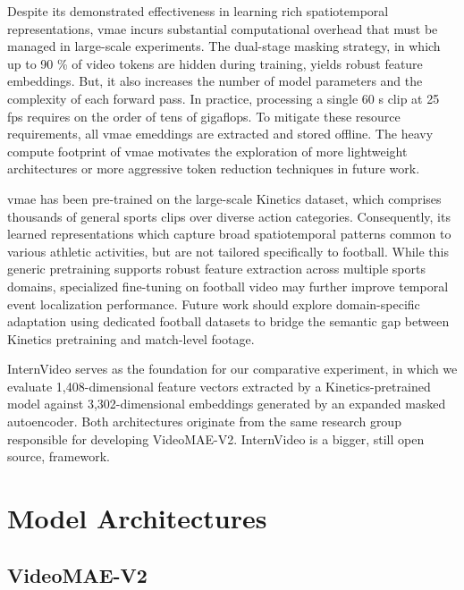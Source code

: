 Despite its demonstrated effectiveness in learning rich spatiotemporal representations, \acrlong{vmae} incurs substantial computational overhead that must be managed in large-scale experiments. The dual-stage masking strategy, in which up to 90 \% of video tokens are hidden during training, yields robust feature embeddings. But, it also increases the number of model parameters and the complexity of each forward pass. In practice, processing a single 60 s clip at 25 fps requires on the order of tens of gigaflops\cite{wang_videomae_2023}. To mitigate these resource requirements, all \acrlong{vmae} emeddings are extracted and stored offline. The heavy compute footprint of \acrlong{vmae} motivates the exploration of more lightweight architectures or more aggressive token reduction techniques in future work. 

\acrlong{vmae} has been pre-trained on the large-scale Kinetics dataset, which comprises thousands of general sports clips over diverse action categories. Consequently, its learned representations which capture broad spatiotemporal patterns common to various athletic activities, but are not tailored specifically to football. While this generic pretraining supports robust feature extraction across multiple sports domains, specialized fine-tuning on football video may further improve temporal event localization performance. Future work should explore domain-specific adaptation using dedicated football datasets to bridge the semantic gap between Kinetics pretraining and match-level footage. 

InternVideo serves as the foundation for our comparative experiment, in which we evaluate 1,408-dimensional feature vectors extracted by a Kinetics-pretrained model against 3,302-dimensional embeddings generated by an expanded masked autoencoder. Both architectures originate from the same research group responsible for developing VideoMAE-V2. InternVideo is a bigger, still open source, framework.


\section{Model Architectures}
\label{sec:model_architectures}

\subsection{VideoMAE-V2}
\label{ssec:videomae_v2}

